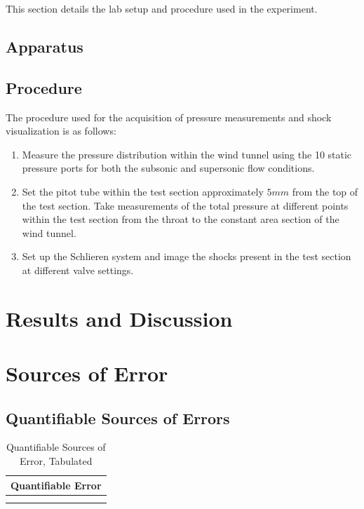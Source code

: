 \documentclass[runningheads]{llncs}
\begin{document}
\noindent
This section details the lab setup and procedure used in the experiment.

\subsection{Apparatus}

\subsection{Procedure}\label{sec:procedure}

The procedure used for the acquisition of pressure measurements and shock visualization is as follows:

\begin{enumerate}

    \item Measure the pressure distribution within the wind tunnel using the 10 static pressure ports for both the subsonic and supersonic flow conditions.
    
    \item Set the pitot tube within the test section approximately $5\si{mm}$ from the top of the test section. Take measurements of the total pressure at different points within the test section from the throat to the constant area section of the wind tunnel.
    
    \item Set up the Schlieren system and image the shocks present in the test section at different valve settings.

\end{enumerate}




\section{Results and Discussion}




\section{Sources of Error}\label{sec:source_of_error}

\subsection{Quantifiable Sources of Errors}
\begin{table}[H]
\begin{center}
    \begin{tabular}{ll}
        \toprule
        \multicolumn{2}{c}{Quantifiable Error}\\
        \midrule
         & \\
         & \\
        \bottomrule
\end{tabular}
\end{center}
\caption{Quantifiable Sources of Error, Tabulated}
\label{tab:quant_error}
\end{table}
\end{document}
